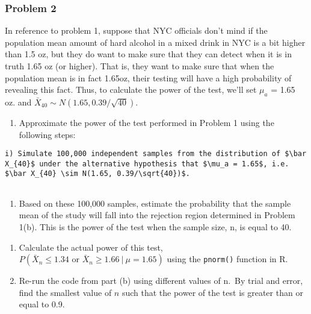 \documentclass[]{article}
\providecommand{\tightlist}{%
  \setlength{\itemsep}{0pt}\setlength{\parskip}{0pt}}
\begin{document}
\hypertarget{problem-2}{%
\subsubsection{Problem 2}\label{problem-2}}

In reference to problem 1, suppose that NYC officials don't mind if the
population mean amount of hard alcohol in a mixed drink in NYC is a bit
higher than 1.5 oz, but they do want to make sure that they can detect
when it is in truth 1.65 oz (or higher). That is, they want to make sure
that when the population mean is in fact 1.65oz, their testing will have
a high probability of revealing this fact. Thus, to calculate the power
of the test, we'll set \(\mu_a\) = 1.65 oz. and
\(\bar X_{40} \sim N(1.65, 0.39/\sqrt{40})\).

\begin{enumerate}
\def\labelenumi{\alph{enumi})}
\tightlist
\item
  Approximate the power of the test performed in Problem 1 using the
  following steps:
\end{enumerate}

\begin{verbatim}
i) Simulate 100,000 independent samples from the distribution of $\bar X_{40}$ under the alternative hypothesis that $\mu_a = 1.65$, i.e. $\bar X_{40} \sim N(1.65, 0.39/\sqrt{40})$.
    
\end{verbatim}

\begin{enumerate}
\def\labelenumi{\roman{enumi})}
\setcounter{enumi}{1}
\tightlist
\item
  Based on these 100,000 samples, estimate the probability that the
  sample mean of the study will fall into the rejection region
  determined in Problem 1(b). This is the power of the test when the
  sample size, n, is equal to 40.
\end{enumerate}

\begin{enumerate}
\def\labelenumi{\alph{enumi})}
\setcounter{enumi}{1}
\item
  Calculate the actual power of this test,
  \(P(\bar X_n \leq 1.34 \text{ or } \bar X_n \geq 1.66~|~\mu=1.65)\)
  using the \texttt{pnorm()} function in R.
\item
  Re-run the code from part (b) using different values of n.~By trial
  and error, find the smallest value of \(n\) such that the power of the
  test is greater than or equal to 0.9.
\end{enumerate}
\end{document}
